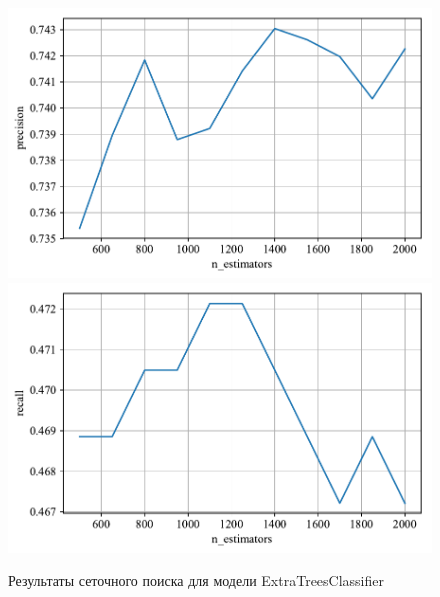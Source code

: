 \begin{figure}
    \centering
    \includegraphics{./images/toloka_extratrees_precision.pdf}
    \includegraphics{./images/toloka_extratrees_recall.pdf}
    \caption{Результаты сеточного поиска для модели ExtraTreesClassifier}
    \label{fig:toloka_extratrees}
\end{figure}


